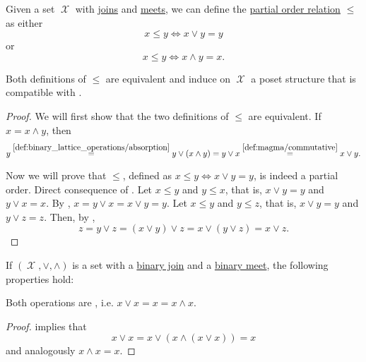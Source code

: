 \begin{proposition}\label{thm:binary_lattice_operations_poset}
  Given a set \( \mscrX \) with \hyperref[def:binary_lattice_operations/join]{joins} and \hyperref[def:binary_lattice_operations/meet]{meets}, we can define the \hyperref[def:poset]{partial order relation} \( \leq \) as either
  \begin{equation*}
    x \leq y \iff x \vee y = y
  \end{equation*}
  or
  \begin{equation*}
    x \leq y \iff x \wedge y = x.
  \end{equation*}

  Both definitions of \( \leq \) are equivalent and induce on \( \mscrX \) a poset structure that is compatible with .
\end{proposition}
\begin{proof}
  We will first show that the two definitions of \( \leq \) are equivalent. If \( x = x \wedge y \), then
  \begin{equation*}
    y
    \overset {\ref{def:binary_lattice_operations/absorption}} =
    y \vee (x \wedge y)
    =
    y \vee x
    \overset {\ref{def:magma/commutative}} =
    x \vee y.
  \end{equation*}

  Now we will prove that \( \leq \), defined as \( x \leq y \iff x \vee y = y \), is indeed a partial order.
   Direct consequence of .
   Let \( x \leq y \) and \( y \leq x \), that is, \( x \vee y = y \) and \( y \vee x = x \). By , \( x = y \vee x = x \vee y = y \).
   Let \( x \leq y \) and \( y \leq z \), that is, \( x \vee y = y \) and \( y \vee z = z \). Then, by ,
  \begin{equation*}
    z = y \vee z = (x \vee y) \vee z = x \vee (y \vee z) = x \vee z.
  \end{equation*}
\end{proof}

\begin{proposition}\label{thm:binary_lattice_operations_properties}
  If \( (\mscrX, \vee, \wedge) \) is a set with a \hyperref[def:binary_lattice_operations/join]{binary join} and a \hyperref[def:binary_lattice_operations/meet]{binary meet}, the following properties hold:
  \begin{DefEnum}
     Both operations are , i.e. \( x \vee x = x = x \wedge x \).
  \end{DefEnum}
\end{proposition}
\begin{proof}
    implies that
  \begin{equation*}
    x \vee x = x \vee (x \wedge (x \vee x)) = x
  \end{equation*}
  and analogously \( x \wedge x = x \).
\end{proof}

